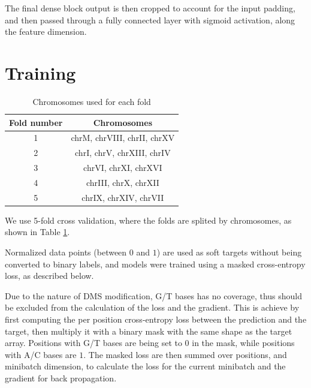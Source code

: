 \documentclass{proposal}
\begin{document}
The final dense block output is then cropped to account for the input padding,
and then passed through a fully connected layer with sigmoid activation, along the feature dimension.


\section{Training}


\begin{table}[h!]
    \centering
    \begin{tabular}{||c c||}
        \hline
        Fold number & Chromosomes \\ [0.5ex]
        \hline\hline
        1 & chrM, chrVIII, chrII, chrXV \\
        \hline
        2 & chrI, chrV, chrXIII, chrIV \\
        \hline
        3 & chrVI, chrXI, chrXVI \\
        \hline
        4 & chrIII, chrX, chrXII \\
        \hline
        5 & chrIX, chrXIV, chrVII \\ [1ex]
        \hline
    \end{tabular}
    \caption{Chromosomes used for each fold}
    \label{table:fold_chrom_split}
\end{table}


We use 5-fold cross validation, where the folds are splited by chromosomes, as shown in Table \ref{table:fold_chrom_split}.

Normalized data points (between $0$ and $1$) are used as soft targets without being converted to binary labels,
and models were trained using a masked cross-entropy loss, as described below.

Due to the nature of DMS modification, G/T bases has no coverage,
thus should be excluded from the calculation of the loss and the gradient.
This is achieve by first computing the per position cross-entropy loss between the prediction and the target,
then multiply it with a binary mask with the same shape as the target array.
Positions with G/T bases are being set to $0$ in the mask, while positions with A/C bases are $1$.
The masked loss are then summed over positions, and minibatch dimension, to calculate the loss for the current minibatch and the gradient for back propagation.
\end{document}
